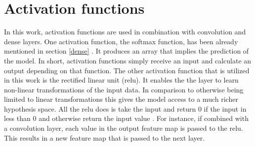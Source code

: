 \section{Activation functions} 
\label{activation}
In this work, activation functions are used in combination with convolution and dense layers. One activation function, the softmax function, has been already mentioned in section \ref{dense} . It produces an array that implies the prediction of the model. In short, activation functions simply receive an input and calculate an output depending on that function. The other activation function that is utilized in this work is the rectified linear unit (relu). It enables the the layer to learn non-linear transformations of the input data. In comparison to otherwise being limited to linear transformations this gives the model access to a much richer hypothesis space. All the relu does is take the input and return 0 if the input in less than 0 and otherwise return the input value \cite[Chapter~3]{cnn}. For instance, if combined with a convolution layer, each value in the output feature map is passed to the relu. This results in a new feature map that is passed to the next layer. 


